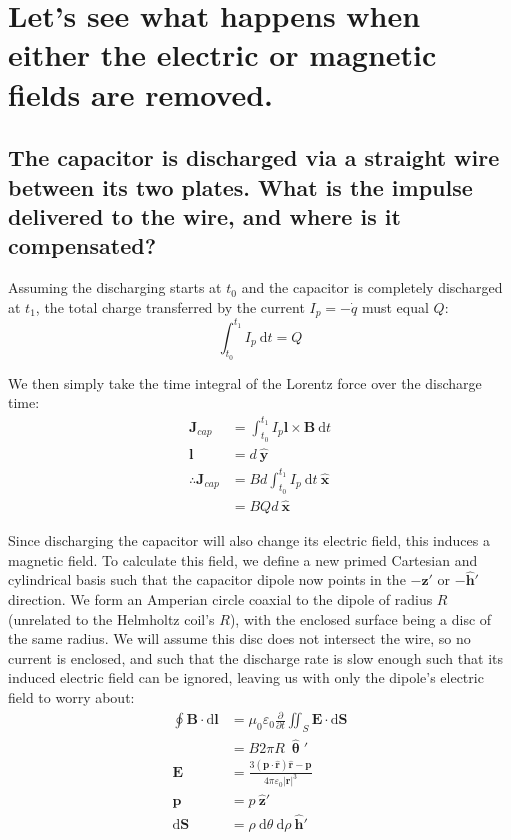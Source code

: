 \documentclass[a4paper]{scrartcl}
\begin{document}
\section{Let's see what happens when either the electric or magnetic fields are removed.}
\subsection{The capacitor is discharged via a straight wire between its two plates. What is the impulse delivered to the wire, and where is it compensated?}
Assuming the discharging starts at \(t_0\) and the capacitor is completely discharged at \(t_1\), the total charge transferred by the current \(I_p = -\dot{q}\) must equal \(Q\):
\[\int_{t_0}^{t_1} I_p \:\mathrm{d}t = Q\]

We then simply take the time integral of the Lorentz force over the discharge time:
\begin{align*}
    \mathbf{J}_{cap} &= \int_{t_0}^{t_1} I_p \mathbf{l} \times \mathbf{B} \:\mathrm{d}t \\
    \mathbf{l} &= d \:\hat{\mathbf{y}} \\
    \therefore \mathbf{J}_{cap} &= B d \int_{t_0}^{t_1} I_p \:\mathrm{d}t \:\hat{\mathbf{x}} \\
    &= B Q d \:\hat{\mathbf{x}}
\end{align*}

Since discharging the capacitor will also change its electric field, this induces a magnetic field. To calculate this field, we define a new primed Cartesian and cylindrical basis such that the capacitor dipole now points in the \(-\hat{\mathbf{z}}'\) or \(-\hat{\mathbf{h}}'\) direction. We form an Amperian circle coaxial to the dipole of radius \(R\) (unrelated to the Helmholtz coil's \(R\)), with the enclosed surface being a disc of the same radius. We will assume this disc does not intersect the wire, so no current is enclosed, and such that the discharge rate is slow enough such that its induced electric field can be ignored, leaving us with only the dipole's electric field to worry about:
\begin{align*}
    \oint \mathbf{B} \cdot \mathrm{d}\mathbf{l} &= \mu_0 \varepsilon_0 \frac{\partial}{\partial t} \iint_S \mathbf{E} \cdot \mathrm{d}\mathbf{S} \\
    &= B 2 \pi R \:\hat{\boldsymbol{\uptheta}}' \\
    \mathbf{E} &= \frac{3 (\mathbf{p} \cdot \hat{\mathbf{r}}) \hat{\mathbf{r}} - \mathbf{p}}{4 \pi \varepsilon_0 |\mathbf{r}|^3} \\
    \mathbf{p} &= p \:\hat{\mathbf{z}}' \\
    \mathrm{d}\mathbf{S} &= \rho \:\mathrm{d}\theta \:\mathrm{d}\rho \:\hat{\mathbf{h}}'
\end{align*}
\end{document}
